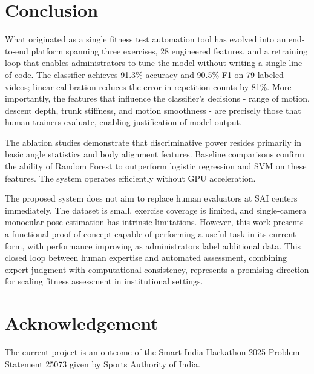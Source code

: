 \documentclass[conference]{IEEEtran}
\begin{document}
\section{Conclusion}
What originated as a single fitness test automation tool has evolved into an end-to-end platform spanning three exercises, 28 engineered features, and a retraining loop that enables administrators to tune the model without writing a single line of code. The classifier achieves 91.3\% accuracy and 90.5\% F1 on 79 labeled videos; linear calibration reduces the error in repetition counts by 81\%. More importantly, the features that influence the classifier's decisions - range of motion, descent depth, trunk stiffness, and motion smoothness - are precisely those that human trainers evaluate, enabling justification of model output.

The ablation studies demonstrate that discriminative power resides primarily in basic angle statistics and body alignment features. Baseline comparisons confirm the ability of Random Forest to outperform logistic regression and SVM on these features. The system operates efficiently without GPU acceleration.

The proposed system does not aim to replace human evaluators at SAI centers immediately. The dataset is small, exercise coverage is limited, and single-camera monocular pose estimation has intrinsic limitations. However, this work presents a functional proof of concept capable of performing a useful task in its current form, with performance improving as administrators label additional data. This closed loop between human expertise and automated assessment, combining expert judgment with computational consistency, represents a promising direction for scaling fitness assessment in institutional settings.

\section*{Acknowledgement}
The current project is an outcome of the Smart India Hackathon 2025 Problem Statement 25073 \cite{sih2025} given by Sports Authority of India.
\end{document}
